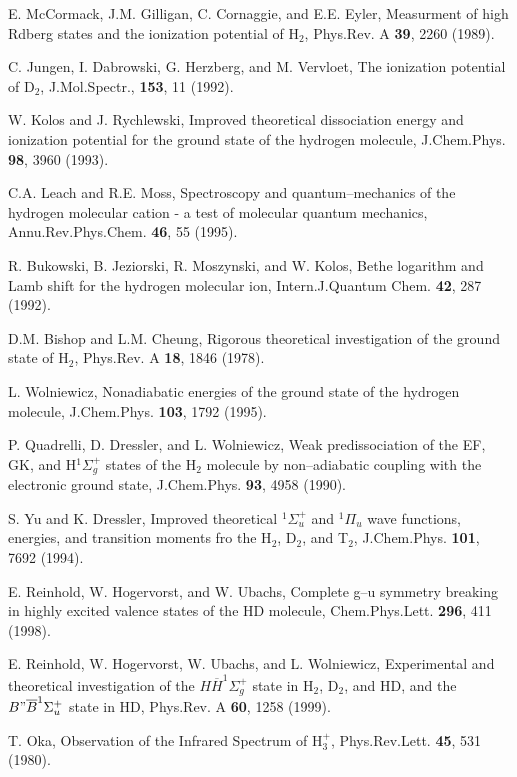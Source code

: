 \begin{thebibliography}{999}
E. McCormack, J.M. Gilligan, C. Cornaggie, and E.E. Eyler,
Measurment of high Rdberg states and the ionization potential
of H$_2$,
Phys.Rev. A {\bf 39}, 2260 (1989).

C. Jungen, I. Dabrowski, G. Herzberg, and M. Vervloet,
The ionization potential of D$_2$,
J.Mol.Spectr., {\bf 153}, 11 (1992).

W. Kolos and J. Rychlewski,
Improved theoretical dissociation energy and
ionization potential for the ground state of the
hydrogen molecule,
J.Chem.Phys. {\bf 98}, 3960 (1993).


C.A. Leach and R.E. Moss,
Spectroscopy and quantum--mechanics of the hydrogen 
molecular cation - a test of molecular quantum mechanics,
Annu.Rev.Phys.Chem. {\bf 46}, 55 (1995). 


R. Bukowski, B. Jeziorski, R. Moszynski, and W. Kolos,
Bethe logarithm and Lamb shift for the hydrogen molecular 
ion,
Intern.J.Quantum Chem. {\bf 42}, 287 (1992).

D.M. Bishop and L.M. Cheung,
Rigorous theoretical investigation of the ground state of H$_2$,
Phys.Rev. A {\bf 18}, 1846 (1978).

L. Wolniewicz,
Nonadiabatic energies of the ground state of the hydrogen
molecule,
J.Chem.Phys. {\bf 103}, 1792 (1995).



P. Quadrelli, D. Dressler, and L. Wolniewicz,
Weak predissociation of the EF, GK, and H$^1\Sigma^+_g$ states
of the H$_2$ molecule by non--adiabatic coupling
with the electronic ground state,
J.Chem.Phys. {\bf 93}, 4958 (1990).


S. Yu and K. Dressler, 
Improved theoretical $^1\Sigma_u^+$ and $^1\Pi_u$ wave functions,
energies, and transition moments fro the H$_2$, D$_2$, and T$_2$,
J.Chem.Phys. {\bf 101}, 7692 (1994).

E. Reinhold, W. Hogervorst, and W. Ubachs,
Complete g--u symmetry breaking in highly excited valence states
of the HD molecule,
Chem.Phys.Lett. {\bf 296}, 411 (1998).

E. Reinhold, W. Hogervorst, W. Ubachs, and L. Wolniewicz,
Experimental and theoretical investigation of the 
$H\overline{H}^1\Sigma_g^+$ state in H$_2$, D$_2$, and HD,
and the $B"\overline{B}^1\Sigma_u^+$ state in HD,
Phys.Rev. A {\bf 60}, 1258 (1999).


T. Oka, 
Observation of the Infrared Spectrum of H$_3^+$, 
Phys.Rev.Lett. {\bf 45}, 531 (1980).


\end{thebibliography}
